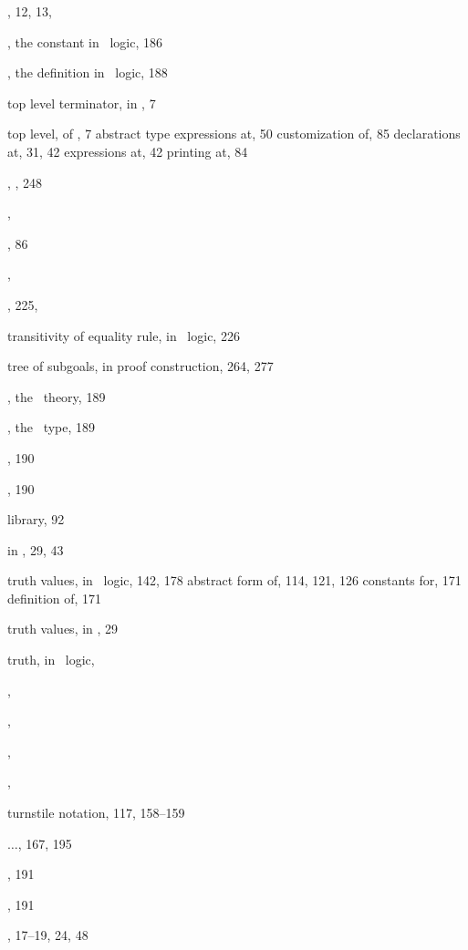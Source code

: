 \begin{theindex}
  \item {}, 12, 13, 
  \item {}, the constant in \HOL\ logic, 186
  \item {}, the definition in \HOL\ logic, 188
  \item top level terminator, in \ML, 7
  \item top level, of \ML, 7
    \subitem abstract type expressions at, 50
    \subitem customization of, 85
    \subitem declarations at, 31, 42
    \subitem expressions at, 42
    \subitem printing at, 84
  \item {}, , 248
  \item {}, 
  \item {}, 86
  \item {}, 
  \item {}, 225, 
  \item transitivity of equality rule, in \HOL\ logic, 226
  \item tree of subgoals, in proof construction, 264, 277
  \item {}, the \HOL\ theory, 189
  \item {}, the \HOL\ type, 189
  \item {}, 190
  \item {}, 190
  \item {} library, 92
  \item {} in \ML, 29, 43
  \item truth values, in \HOL\ logic, 142, 178
    \subitem abstract form of, 114, 121, 126
    \subitem constants for, 171
    \subitem definition of, 171
  \item truth values, in \ML, 29
  \item truth, in \HOL\ logic, 
  \item {}, 
  \item {}, 
  \item {}, 
  \item {}, 
  \item turnstile notation, 117, 158--159
  \item $\ldots$, 167, 195
  \item {}, 191
  \item {}, 191
  \item {}, 17--19, 24, 48

\end{theindex}
